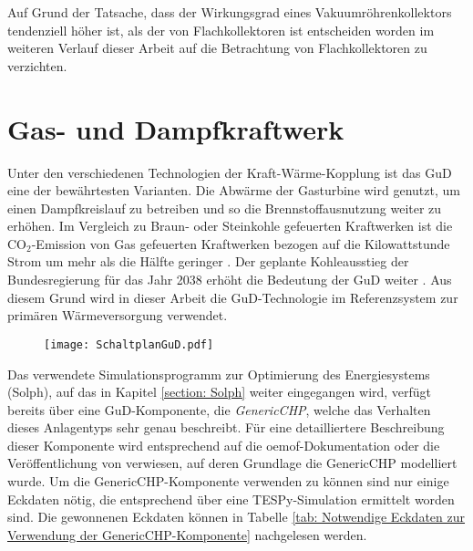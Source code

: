 Auf Grund der Tatsache, dass der Wirkungsgrad eines Vakuumröhrenkollektors tendenziell höher ist, als der von Flachkollektoren ist entscheiden worden im weiteren Verlauf dieser Arbeit auf die Betrachtung von Flachkollektoren zu verzichten.

\section{Gas- und Dampfkraftwerk}\label{section: Gas- und Dampfkraftwerk}
Unter den verschiedenen Technologien der Kraft-Wärme-Kopplung ist das \acl{GuD} eine der bewährtesten Varianten. Die Abwärme der Gasturbine wird genutzt, um einen Dampfkreislauf zu betreiben und so die Brennstoffausnutzung weiter zu erhöhen. Im Vergleich zu Braun- oder Steinkohle gefeuerten Kraftwerken ist die CO$_2$-Emission von Gas gefeuerten Kraftwerken bezogen auf die Kilowattstunde Strom um mehr als die Hälfte geringer \cite{statista2019}. Der geplante Kohleausstieg der Bundesregierung für das Jahr 2038 erhöht die Bedeutung der \ac{GuD} weiter \cite{bmwi2019}. Aus diesem Grund wird in dieser Arbeit die \ac{GuD}-Technologie im Referenzsystem zur primären Wärmeversorgung verwendet.
	\begin{figure}[h]
		\centering
		\texttt{[image: SchaltplanGuD.pdf]}
		\label{fig: Schaltplan GuD-Anlage}
	\end{figure}

Das verwendete Simulationsprogramm zur Optimierung des Energiesystems (Solph), auf das in Kapitel \ref{section: Solph} weiter eingegangen wird, verfügt bereits über eine \ac{GuD}-Komponente, die \textit{GenericCHP}, welche das Verhalten dieses Anlagentyps sehr genau beschreibt. Für eine detailliertere Beschreibung dieser Komponente wird entsprechend auf die \ac{oemof}-Dokumentation \cite{oemof2019} oder die Veröffentlichung von \citet{Mollenhauer2016} verwiesen, auf deren Grundlage die GenericCHP modelliert wurde. Um die GenericCHP-Komponente verwenden zu können sind nur einige Eckdaten nötig, die entsprechend über eine \ac{TESPy}-Simulation ermittelt worden sind. Die gewonnenen Eckdaten können in Tabelle \ref{tab: Notwendige Eckdaten zur Verwendung der GenericCHP-Komponente} nachgelesen werden.


